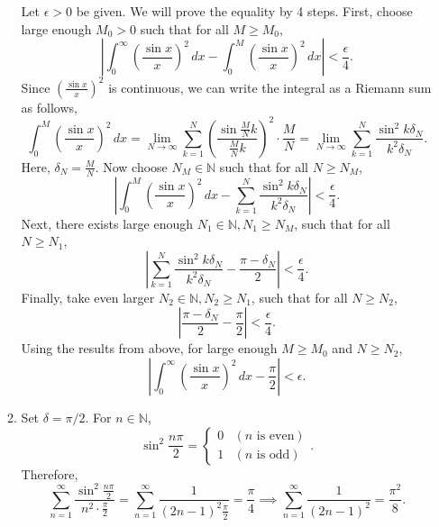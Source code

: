 \documentclass[12pt]{report}
\newcommand{\num}[1]{\item[\textbf{\sffamily #1}]}
\newcommand{\abs}[1]{\left| #1 \right|}
\newcommand{\paren}[1]{\left( #1 \right)}
\newcommand{\ra}{\rightarrow}
\newcommand{\N}{\mathbb{N}}
\renewcommand{\d}[1]{\,d{#1}}
\begin{document}
\begin{enumerate}
\begin{enumerate}
        Let \(\epsilon > 0\) be given. We will prove the equality by 4 steps. First, choose large enough \(M_0 > 0\) such that for all \(M \geq M_0\),
        \[
            \abs{\int_0^\infty \paren{\frac{\sin x}{x}}^2 \d{x} - \int_0^M \paren{\frac{\sin x}{x}}^2 \d{x}} < \frac{\epsilon}{4}.
        \]
        Since \(\paren{\frac{\sin x}{x}}^2\) is continuous, we can write the integral as a Riemann sum as follows,
        \[
            \int_0^M \paren{\frac{\sin x}{x}}^2 \d{x} = \lim_{N \ra \infty} \sum_{k=1}^N \paren{\frac{\sin \frac{M}{N}k}{\frac{M}{N}k}}^2 \cdot \frac{M}{N} = \lim_{N \ra \infty} \sum_{k=1}^N \frac{\sin^2 k\delta_N}{k^2\delta_N}.
        \]
        Here, \(\delta_N = \frac{M}{N}\). Now choose \(N_M \in \N\) such that for all \(N \geq N_M\),
        \[
            \abs{\int_0^M \paren{\frac{\sin x}{x}}^2 \d{x} - \sum_{k=1}^N \frac{\sin^2 k\delta_N}{k^2\delta_N}} < \frac{\epsilon}{4}.
        \]
        Next, there exists large enough \(N_1 \in \N, N_1 \geq N_M\), such that for all \(N \geq N_1\),
        \[
            \abs{\sum_{k=1}^N \frac{\sin^2 k\delta_N}{k^2\delta_N} - \frac{\pi - \delta_N}{2}} < \frac{\epsilon}{4}.
        \]
        Finally, take even larger \(N_2 \in \N, N_2 \geq N_1\), such that for all \(N \geq N_2\),
        \[
            \abs{\frac{\pi - \delta_N}{2} - \frac{\pi}{2}} < \frac{\epsilon}{4}.
        \]
        Using the results from above, for large enough \(M \geq M_0\) and \(N \geq N_2\),
        \[
            \abs{\int_0^\infty \paren{\frac{\sin x}{x}}^2 \d{x} - \frac{\pi}{2}} < \epsilon.
        \]

        \num{(e)} Set \(\delta = \pi / 2\). For \(n \in \N\),
        \[
            \sin^2 \frac{n\pi}{2} = \begin{cases}
                0 & (n \text{ is even}) \\
                1 & (n \text{ is odd})
            \end{cases}.
        \]
        Therefore,
        \[
            \sum_{n=1}^\infty \frac{\sin^2 \frac{n\pi}{2}}{n^2\cdot \frac{\pi}{2}} = \sum_{n=1}^\infty \frac{1}{(2n-1)^2 \frac{\pi}{2}} = \frac{\pi}{4} \implies \sum_{n=1}^\infty \frac{1}{(2n-1)^2} = \frac{\pi^2}{8}.
        \]
    \end{enumerate}


\end{enumerate}
\end{document}
